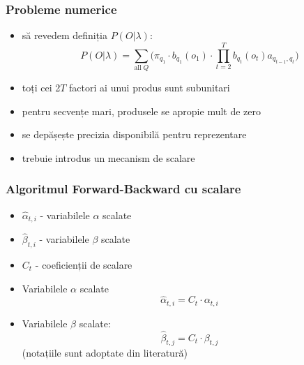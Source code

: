 \begin{frame}
  \frametitle{Probleme numerice}
  \begin{itemize}
  \item să revedem definiția $P(O \vert \lambda)$:
    \begin{equation*}
      P(O \vert \lambda) = \displaystyle\sum_{\text{all}\;Q} \Big(
      \pi_{q_1} \cdot b_{q_1}(o_1) \cdot
      \displaystyle\prod_{t=2}^{T} b_{q_t}(o_t) a_{q_{t-1},q_t}
      \Big)
    \end{equation*}
    \pause
  \item toți cei 2$T$ factori ai unui produs sunt subunitari
  \item pentru secvențe mari, produsele se apropie mult de zero
  \item se depășește precizia disponibilă pentru reprezentare
  \item trebuie introdus un mecanism de \alert{scalare}
  \end{itemize}
\end{frame}


\begin{frame}
  \frametitle{Algoritmul Forward-Backward cu scalare}
  \begin{itemize}
  \item $\hat{\alpha}_{t,i}$ - variabilele $\alpha$ scalate
  \item $\hat{\beta}_{t,i}$ - variabilele $\beta$ scalate
    \vspace*{1em}
  \item $C_t$ - coeficienții de scalare \vspace*{1em}
  \item Variabilele $\alpha$ scalate
    \begin{equation}
      \label{eq:scaled-alpha}
      \hat{\alpha}_{t,i} = C_t \cdot \alpha_{t,i}
    \end{equation}
  \item Variabilele $\beta$ scalate:
    \begin{equation}
      \label{eq:scaled-beta}
      \hat{\beta}_{t,j} = C_t \cdot \beta_{t,j}
    \end{equation}
    (notațiile sunt adoptate din literatură) 
  \end{itemize}
\end{frame}

